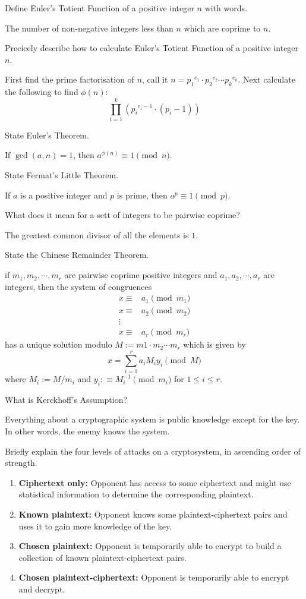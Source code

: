 \documentclass{article}
\newcounter{qcounter}
\newcommand{\showqcounter}{\theqcounter}
\newcommand{\question}{\vspace{5mm}\addtocounter{qcounter}{1}\vspace{5mm}{\bf Q\showqcounter: }}
\newcommand{\answer}{\vspace{5mm}{\bf A\showqcounter: }}
\begin{document}
\question Define Euler's Totient Function of a positive integer $n$ with words.

\answer The number of non-negative integers less than $n$ which are coprime to $n$.


\question Precicely describe how to calculate Euler's Totient Function of a positive integer $n$.

\answer First find the prime factorisation of $n$, call it 
$n = {p_1}^{e_1} \cdot {p_2}^{e_2} \cdots {p_k}^{e_k}$. Next calculate the following to find $\phi(n)$:
$$
    \prod_{i = 1}^k \left( {p_i}^{e_i - 1} \cdot (p_i - 1) \right)
$$

\question State Euler's Theorem.

\answer If $\gcd(a, n) = 1$, then $a^{\phi(n)} \equiv 1 \pmod n$.


\question State Fermat's Little Theorem.

\answer If $a$ is a positive integer and $p$ is prime, then $a^p \equiv 1 \pmod{p}$.


\question What does it mean for a sett of integers to be pairwise coprime?

\answer The greatest common divisor of all the elements is $1$.


\question State the Chinese Remainder Theorem.

\answer if $m_1, m_2, \cdots, m_r$ are pairwise coprime positive integers and $a_1, a_2, \cdots, a_r$ are integers, 
then the system of congruences 
\begin{align*}
x \equiv& a_1 \pmod{m_1} \\
x \equiv& a_2 \pmod{m_2} \\
  \vdots&\\
x \equiv& a_r \pmod{m_r}
\end{align*}
has a unique solution modulo $M := m1 \cdot m_2 \cdots m_r$ which is given by
$$
    x = \sum_{i=1}^r a_i M_i y_i \pmod{M}
$$
where $M_i := M / m_i$ and $y_i :\equiv M_i^{-1} \pmod{m_i}$ for $1 \leq i \leq r$. 


\question What is Kerckhoff's Assumption?

\answer Everything about a cryptographic system is public knowledge except for the key. In other words, the enemy knows the system.


\question Briefly explain the four levels of attacks on a cryptosystem, in ascending order of strength.

\answer \begin{enumerate}
  \item {\bf Ciphertext only:} Opponent has access to some ciphertext and might use statistical information to determine the corresponding plaintext.
  \item {\bf Known plaintext:} Opponent knows some plaintext-ciphertext pairs and uses it to gain more knowledge of the key.
  \item {\bf Chosen plaintext:} Opponent is temporarily able to encrypt to build a collection of known plaintext-ciphertext pairs. 
  \item {\bf Chosen plaintext-ciphertext:} Opponent is temporarily able to encrypt and decrypt.
\end{enumerate}
\end{document}
